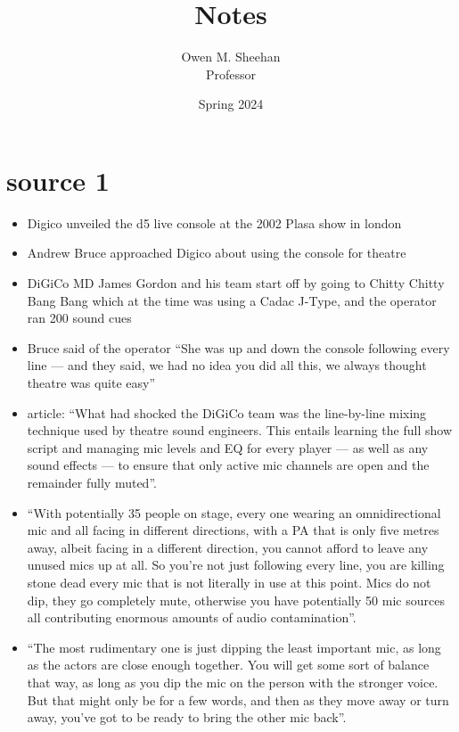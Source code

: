 \documentclass[12pt]{article}
\title{\class{} Notes}
\author{Owen M. Sheehan\\Professor \prof{}}
\date{Spring 2024}
\begin{document}
\maketitle
\tableofcontents
\newpage

    \section{source 1 \autocite{bruceAndrewBruceMusical}}
        \begin{itemize}
            \item Digico unveiled the d5 live console at the 2002 Plasa show in london
            \item Andrew Bruce approached Digico about using the console for theatre
            \item DiGiCo MD James Gordon and his team start off by going to Chitty Chitty Bang Bang which at the time was using a Cadac J-Type, and the operator ran 200 sound cues
            \item Bruce said of the operator ``She was up and down the console following every line --- and they said, we had no idea you did all this, we always thought theatre was quite easy''
            \item article: ``What had shocked the DiGiCo team was the line-by-line mixing technique used by theatre sound engineers. This entails learning the full show script and managing mic levels and EQ for every player --- as well as any sound effects --- to ensure that only active mic channels are open and the remainder fully muted''.
            \item ``With potentially 35 people on stage, every one wearing an omnidirectional mic and all facing in different directions, with a PA that is only five metres away, albeit facing in a different direction, you cannot afford to leave any unused mics up at all. So you're not just following every line, you are killing stone dead every mic that is not literally in use at this point. Mics do not dip, they go completely mute, otherwise you have potentially 50 mic sources all contributing enormous amounts of audio contamination''.
            \item ``The most rudimentary one is just dipping the least important mic, as long as the actors are close enough together. You will get some sort of balance that way, as long as you dip the mic on the person with the stronger voice. But that might only be for a few words, and then as they move away or turn away, you've got to be ready to bring the other mic back''.

\end{itemize}
\end{document}
